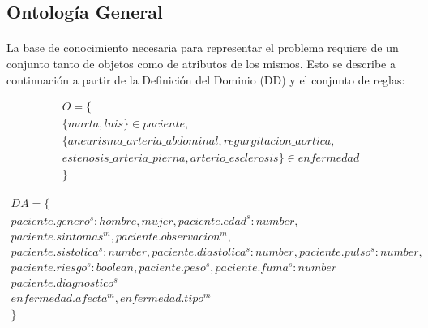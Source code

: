 \documentclass[10pt, a4paper,spanish]{article}
\begin{document}
		\subsection{Ontología General}

			\paragraph{}
			La base de conocimiento necesaria para representar el problema requiere de un conjunto tanto de objetos como de atributos de los mismos. Esto se describe a continuación a partir de la Definición del Dominio (DD) y el conjunto de reglas:

			\begin{multline*}
				O = \{ \\
					\{marta, luis\} \in paciente, \\
					\{aneurisma\_arteria\_abdominal, regurgitacion\_aortica, \\
					estenosis\_arteria\_pierna, arterio\_esclerosis \} \in enfermedad \\
				\}
			\end{multline*}

			\begin{multline*}
				DA = \{ \\
					paciente.genero^s:{hombre, mujer}, paciente.edad^s:number, \\
					paciente.sintomas^m, paciente.observacion^m, \\
					paciente.sistolica^s:number, paciente.diastolica^s:number, paciente.pulso^s:number, \\
					paciente.riesgo^s:boolean, paciente.peso^s, paciente.fuma^s:number \\
					paciente.diagnostico^s \\
					enfermedad.afecta^m, enfermedad.tipo^m \\
				\}
			\end{multline*}
\end{document}
